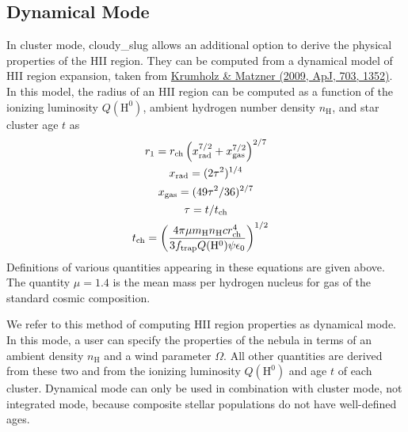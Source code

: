 \documentclass[letterpaper,10pt,english]{sphinxmanual}
\begin{document}
\subsection{Dynamical Mode}
\label{cloudy:dynamical-mode}\label{cloudy:sssec-cloudy-dynamical-cluster-mode}
In cluster mode, cloudy\_slug allows an additional option to derive the
physical properties of the HII region. They can be computed from a
dynamical model of HII region expansion, taken from \href{http://adsabs.harvard.edu/abs/2009ApJ...703.1352K}{Krumholz \&
Matzner (2009, ApJ, 703, 1352)}.  In this model,
the radius of an HII region can be computed as a function of the
ionizing luminosity \(Q(\mathrm{H}^0)\), ambient hydrogen number
density \(n_{\mathrm{H}}\), and star cluster age \(t\) as
\begin{gather}
\begin{split}r_1 & = r_{\mathrm{ch}}
\left(x_{\mathrm{rad}}^{7/2} +
x_{\mathrm{gas}}^{7/2}\right)^{2/7} \\\end{split}\notag\\\begin{split}x_{\mathrm{rad}} &= (2\tau^2)^{1/4} \\\end{split}\notag\\\begin{split}x_{\mathrm{gas}} &= (49\tau^2/36)^{2/7} \\\end{split}\notag\\\begin{split}\tau &= t/t_{\mathrm{ch}} \\\end{split}\notag\\\begin{split}t_{\mathrm{ch}} & = \left(\frac{4\pi \mu m_{\mathrm{H}}
n_{\mathrm{H}} c r_{\mathrm{ch}}^4}{3 f_{\mathrm{trap}}
Q(\mathrm{H}^0) \psi \epsilon_0}\right)^{1/2}\end{split}\notag
\end{gather}
Definitions of various quantities appearing in these equations are
given above. The quantity \(\mu = 1.4\) is the mean
mass per hydrogen nucleus for gas of the standard cosmic
composition.

We refer to this method of computing HII region properties as
dynamical mode. In this mode, a user can specify the properties of the
nebula in terms of an ambient density \(n_{\mathrm{H}}\) and
a wind parameter \(\Omega\). All other quantities are
derived from these two and from the ionizing luminosity
\(Q(\mathrm{H}^0)\) and age \(t\) of each cluster. Dynamical
mode can only be used in combination with cluster mode, not integrated
mode, because composite stellar populations do not have well-defined
ages.
\end{document}
